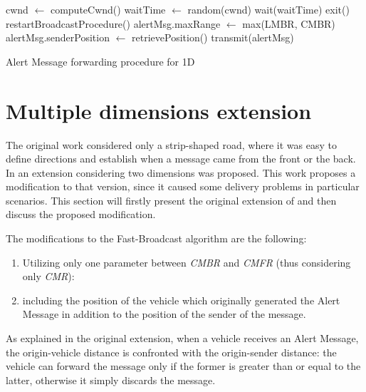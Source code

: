 		\begin{algorithm}[H]
			\begin{algorithmic}[1]
				\State cwnd $\gets$ computeCwnd()
				\State waitTime $\gets$ random(cwnd)
				\State wait(waitTime)
				\State exit()
				\State restartBroadcastProcedure()
				\Else 
				\State alertMsg.maxRange $\gets$ max(LMBR, CMBR)
				\State alertMsg.senderPosition $\gets$ retrievePosition()
				\State transmit(alertMsg)
				\EndIf 
			\end{algorithmic}
			\caption{Alert Message forwarding procedure for 1D}
			\label{alg:alert-message-forwarding-1d}
		\end{algorithm}
	
	\section{Multiple dimensions extension}
		\label{sec:fb-multiple-dimensions}
		The original work \cite{4199282} considered only a strip-shaped road, where it was easy to define directions and establish when a message came from the front or the back. In \cite{BAR2017} an extension considering two dimensions was proposed. This work proposes a modification to that version, since it caused some delivery problems in particular scenarios. This section will firstly present the original extension of \cite{BAR2017} and then discuss the proposed modification.
		
		
		The modifications to the Fast-Broadcast algorithm are the following:
		\begin{enumerate}
			\item Utilizing only one parameter between \textit{CMBR} and \textit{CMFR} (thus considering only \textit{CMR}):
			\item including the position of the vehicle which originally generated the Alert Message in addition to the position of the sender of the message.
		\end{enumerate}
		
		
		As explained in the original extension, when a vehicle receives an Alert Message, the origin-vehicle distance is confronted with the origin-sender distance: the vehicle can forward the message only if the former is greater than or equal to the latter, otherwise it simply discards the message.
		
